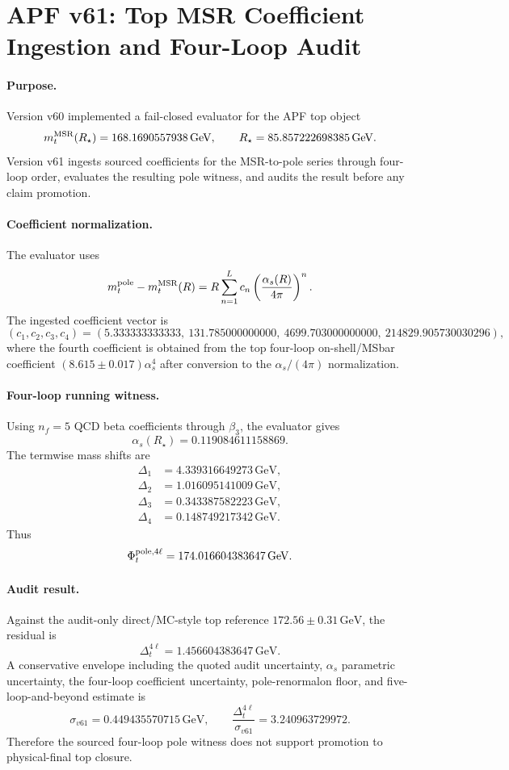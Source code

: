 
\section{APF v61: Top MSR Coefficient Ingestion and Four-Loop Audit}
\label{sec:top-msr-v61}

\paragraph{Purpose.}
Version v60 implemented a fail-closed evaluator for the APF top object
\[
  m_t^{\rm MSR}(R_\star)=168.1690557938\,\mathrm{GeV},\qquad
  R_\star=85.857222698385\,\mathrm{GeV}.
\]
Version v61 ingests sourced coefficients for the MSR-to-pole series through four-loop order, evaluates the resulting pole witness, and audits the result before any claim promotion.

\paragraph{Coefficient normalization.}
The evaluator uses
\[
  m_t^{\rm pole}-m_t^{\rm MSR}(R)
  = R\sum_{n=1}^L c_n\left(\frac{\alpha_s(R)}{4\pi}\right)^n.
\]
The ingested coefficient vector is
\[
  (c_1,c_2,c_3,c_4)
  = \left(
  5.333333333333,\ 131.785000000000,\ 4699.703000000000,\ 214829.905730030296
  \right),
\]
where the fourth coefficient is obtained from the top four-loop on-shell/MSbar coefficient
\((8.615\pm0.017)\alpha_s^4\) after conversion to the \(\alpha_s/(4\pi)\) normalization.

\paragraph{Four-loop running witness.}
Using \(n_f=5\) QCD beta coefficients through \(\beta_3\), the evaluator gives
\[
  \alpha_s(R_\star)=0.119084611158869.
\]
The termwise mass shifts are
\[
\begin{aligned}
  \Delta_1 &= 4.339316649273\,\mathrm{GeV},\\
  \Delta_2 &= 1.016095141009\,\mathrm{GeV},\\
  \Delta_3 &= 0.343387582223\,\mathrm{GeV},\\
  \Delta_4 &= 0.148749217342\,\mathrm{GeV}.
\end{aligned}
\]
Thus
\[
  \Phi_t^{\rm pole,4\ell}
  = 174.016604383647\,\mathrm{GeV}.
\]

\paragraph{Audit result.}
Against the audit-only direct/MC-style top reference
\(172.56\pm0.31\,\mathrm{GeV}\), the residual is
\[
  \Delta_t^{4\ell}=1.456604383647\,\mathrm{GeV}.
\]
A conservative envelope including the quoted audit uncertainty, \(\alpha_s\) parametric uncertainty, the four-loop coefficient uncertainty, pole-renormalon floor, and five-loop-and-beyond estimate is
\[
  \sigma_{v61}=0.449435570715\,\mathrm{GeV},
  \qquad
  \frac{\Delta_t^{4\ell}}{\sigma_{v61}}=3.240963729972.
\]
Therefore the sourced four-loop pole witness does not support promotion to physical-final top closure.

